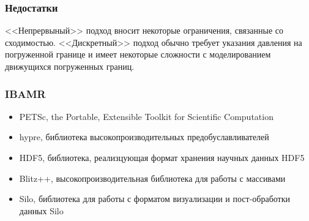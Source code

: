\documentclass[14pt, notes]{beamer}
\begin{document}
\begin{frame}
\frametitle{Недостатки}
<<Непрервыный>> подход вносит некоторые ограничения, связанные со сходимостью.
<<Дискретный>> подход обычно требует указания давления на погруженной границе и имеет некоторые сложности с моделированием движущихся погруженных границ.
\end{frame}

\begin{frame}
\frametitle{IBAMR}
    \begin{itemize}
        \item \alert<+>{PETSc, the Portable, Extensible Toolkit for Scientific Computation}
        \item \alert<+>{hypre, библиотека высокопроизводительных предобуславливателей}
        \item \alert<+>{HDF5, библиотека, реализцующая формат хранения научных данных HDF5}
        \item \alert<+>{Blitz++, высокопроизводительная библиотека для работы с массивами}
        \item \alert<+>{Silo, библиотека для работы с форматом визуализации и пост-обработки данных Silo}
    \end{itemize}
\end{frame}
\end{document}
